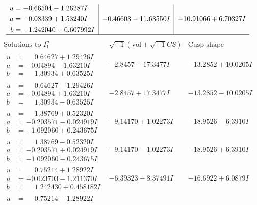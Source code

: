 \documentclass[1p]{elsarticle_modified}
\theoremstyle{definition}
\newcommand{\I}{\sqrt{-1}}
\begin{document}
$$\begin{array}{c|c|c}
\begin{aligned}
u &= -0.66504 - 1.26287 I \\
a &= -0.08339 + 1.53240 I \\
b &= -1.242040 - 0.607992 I\end{aligned}
 & -0.46603 - 11.63550 I & -10.91066 + 6.70327 I\\
 \hline 
 \end{array}$$\newpage$$\begin{array}{c|c|c}  
\text{Solutions to }I^u_{1}& \I (\text{vol} + \sqrt{-1}CS) & \text{Cusp shape}\\
 \hline 
\begin{aligned}
u &= \phantom{-}0.64627 + 1.29426 I \\
a &= -0.04894 - 1.63210 I \\
b &= \phantom{-}1.30934 + 0.63525 I\end{aligned}
 & -2.8457 - 17.3477 I & -13.2852 + 10.0205 I \\ \hline\begin{aligned}
u &= \phantom{-}0.64627 - 1.29426 I \\
a &= -0.04894 + 1.63210 I \\
b &= \phantom{-}1.30934 - 0.63525 I\end{aligned}
 & -2.8457 + 17.3477 I & -13.2852 - 10.0205 I \\ \hline\begin{aligned}
u &= \phantom{-}1.38769 + 0.52320 I \\
a &= -0.203571 - 0.024919 I \\
b &= -1.092060 + 0.243675 I\end{aligned}
 & -9.14170 + 1.02273 I & -18.9526 - 6.3910 I \\ \hline\begin{aligned}
u &= \phantom{-}1.38769 - 0.52320 I \\
a &= -0.203571 + 0.024919 I \\
b &= -1.092060 - 0.243675 I\end{aligned}
 & -9.14170 - 1.02273 I & -18.9526 + 6.3910 I \\ \hline\begin{aligned}
u &= \phantom{-}0.75214 + 1.28922 I \\
a &= -0.023703 - 1.211370 I \\
b &= \phantom{-}1.242430 + 0.458182 I\end{aligned}
 & -6.39323 - 8.37491 I & -16.6922 + 6.0879 I \\ \hline\begin{aligned}
u &= \phantom{-}0.75214 - 1.28922 I \\

\end{aligned}
\end{array}$$
\end{document}

